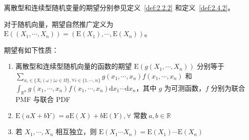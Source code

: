 \documentclass[../main.tex]{subfiles}
\begin{document}
离散型和连续型随机变量的期望分别参见定义~\ref{def:2.2.2} 和定义~\ref{def:2.4.2}。

对于随机向量，期望自然推广定义为 $\mathrm E((X_1,\cdots,X_n))=(\mathrm E(X_1),\cdots,\mathrm E(X_n))$。

\begin{proposition}
    期望有如下性质：
    \begin{enumerate}
        \item 离散型和连续型随机向量的函数的期望 $\mathrm E(g(X_1,\cdots,X_n))$ 分别等于\\
              $\sum_{x_i\in\{X_i(\omega)|\omega\in\Omega\},\forall i\in\{1,\cdots,n\}}g(x_1,\cdots,x_n)f(x_1,\cdots,x_n)$ 和 $\int_{\mathbb R^n}g(x_1,\cdots,x_n)f(x_1,\cdots,x_n)\mathrm dx_1\cdots\mathrm dx_n$，其中 $g$ 为可测函数，$f$ 分别为联合 PMF 与联合 PDF
        \item $\mathrm E(aX+bY)=a\mathrm E(X)+b\mathrm E(Y),\forall\text{ 常数}\ a,b\in\mathbb R$
        \item 若 $X_1,\cdots,X_n$ 相互独立，则 $\mathrm E(X_1\cdots X_n)=\mathrm E(X_1)\cdots\mathrm E(X_n)$
    \end{enumerate}
\end{proposition}
\end{document}

